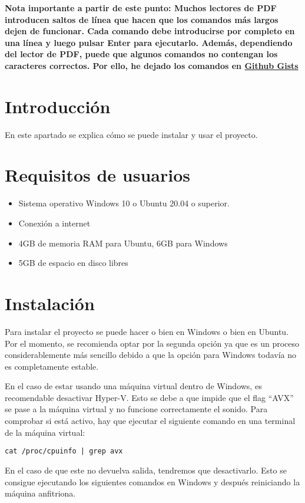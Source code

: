 \textbf{Nota importante a partir de este punto: Muchos lectores de PDF introducen saltos de línea que hacen que los comandos más largos dejen de funcionar. Cada comando debe introducirse por completo en una línea y luego pulsar Enter para ejecutarlo. Además, dependiendo del lector de PDF, puede que algunos comandos no contengan los caracteres correctos. Por ello, he dejado los comandos en \href{https://gist.github.com/rogama25/3f7754431ae2acbdcab625117e012432}{Github Gists}}

\section{Introducción}
En este apartado se explica cómo se puede instalar y usar el proyecto.

\section{Requisitos de usuarios}
\begin{itemize}
    \item Sistema operativo Windows 10 o Ubuntu 20.04 o superior.
    \item Conexión a internet
    \item 4GB de memoria RAM para Ubuntu, 6GB para Windows
    \item 5GB de espacio en disco libres
\end{itemize}

\section{Instalación}
Para instalar el proyecto se puede hacer o bien en Windows o bien en Ubuntu. Por el momento, se recomienda optar por la segunda opción ya que es un proceso considerablemente más sencillo debido a que la opción para Windows todavía no es completamente estable.

En el caso de estar usando una máquina virtual dentro de Windows, es recomendable desactivar Hyper-V. Esto se debe a que impide que el flag ``AVX'' se pase a la máquina virtual y no funcione correctamente el sonido. Para comprobar si está activo, hay que ejecutar el siguiente comando en una terminal de la máquina virtual:

\texttt{cat /proc/cpuinfo | grep avx}

En el caso de que este no devuelva salida, tendremos que desactivarlo. Esto se consigue ejecutando los siguientes comandos en Windows y después reiniciando la máquina anfitriona.

